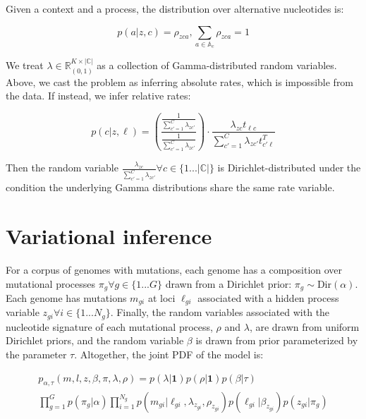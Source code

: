 \documentclass{article}
\begin{document}
Given a context and a process, the distribution over alternative nucleotides is:

\begin{equation}
p(a | z, c) = \rho_{zca}, \sum_{a \in \mathbb{A}_c} \rho_{zca} = 1
\end{equation}

We treat $\lambda \in \mathbb{R}^{K \times |\mathbb{C}|}_{(0,1)}$ as a collection of Gamma-distributed random variables. Above, we cast the problem as inferring absolute rates, which is impossible from the data. If instead, we infer relative rates:

\begin{equation}
p(c | z, \ell) = 
\left( \frac{\frac{1}{\sum_{c'=1}^{C} \lambda_{zc'}}}{\frac{1}{\sum_{c'=1}^{C} \lambda_{zc'}}} \right) \cdot \frac{\lambda_{zc}t_{\ell c}}{\sum_{c'=1}^{C} \lambda_{zc'}t^{T}_{c' \ell}} 
\end{equation}

Then the random variable $\frac{\lambda_{zc}}{\sum_{c'=1}^{C} \lambda_{zc'}} \forall c \in \{1 ... |\mathbb{C}|\}$ is Dirichlet-distributed under the condition the underlying Gamma distributions share the same rate variable. 

\section{Variational inference}

For a corpus of genomes with mutations, each genome has a composition over mutational processes $\pi_g\forall g \in \{1...G\}$ drawn from a Dirichlet prior: $\pi_g \sim \mathrm{Dir}(\alpha)$. Each genome has mutations $m_{gi}$ at loci $\ell_{gi}$ associated with a hidden process variable $z_{gi} \forall i \in \{1...N_g\}$. Finally, the random variables associated with the nucleotide signature of each mutational process, $\rho$ and $\lambda$, are drawn from uniform Dirichlet priors, and the random variable $\beta$ is drawn from prior parameterized by the parameter $\tau$. Altogether, the joint PDF of the model is:

\begin{align*}
p_{\alpha,\tau}(m,l,z,\beta,\pi,\lambda,\rho) = p(\lambda | \textbf{1})p(\rho | \textbf{1})p(\beta | \tau) \\
	 \prod_{g=1}^G p( \pi_g | \alpha ) \prod_{i=1}^{N_g} p(m_{gi} | \ell_{gi}, \lambda_{z_{gi}}, \rho_{z_{gi}} ) p( \ell_{gi} | \beta_{z_{gi}} ) p(z_{gi} | \pi_g )
\end{align*}
\end{document}
